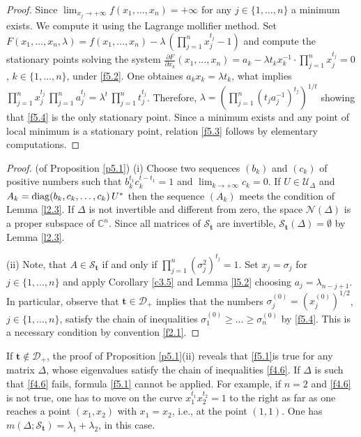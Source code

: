\documentclass{amsart}
\begin{document}
\begin{proof}
Since $\lim_{x_j \to +\infty} f(x_1,\ldots,x_n) = +\infty$ for any $j \in \{ 1,\ldots,n\}$ a minimum exists. We compute it using the Lagrange mollifier method. Set $F(x_1,\ldots,x_n,\lambda) = f(x_1,\ldots,x_n) - \lambda  \, \left(\prod_{j=1}^n x_j^{t_j} - 1\right)$ and compute the stationary points solving the system $\frac{{\partial} F}{{\partial} x_k} (x_1,\ldots,x_n) = a_k - \lambda t_kx_k^{-1} \cdot \prod_{j=1}^n x_j^{t_j} =0$, $k \in \{ 1,\ldots,n \}$, under \eqref{f5.2}. One obtaines $a_kx_k=\lambda t_k$, what implies $\prod_{j=1}^n x_j^{t_j} \, \prod_{j=1}^n a_j^{t_j} = \lambda^t \, \prod_{j=1}^n t_j^{t_j}$. Therefore, $\lambda= \left( \prod_{j=1}^n (t_j a_j^{-1})^{t_j} \right)^{1/t}$ showing that \eqref{f5.4} is the only stationary point. Since a minimum exists and any point of local minimum is a stationary point, relation \eqref{f5.3} follows by elementary computations.
\end{proof}

\begin{proof} (of Proposition \ref{p5.1})
(i) Choose two sequences $(b_k)$ and $(c_k)$ of positive numbers such that $b_k^{t_1} c_k^{t-t_1} = 1$ and $\lim_{k \to +\infty} c_k =0$. If $U \in{\mathcal U}_\Delta$ and $A_k= {\rm diag}(b_k,c_k,\ldots,c_k) \, U^*$ then the sequence $(A_k)$ meets the condition of Lemma \ref{l2.3}. If $\Delta$ is not invertible and different from zero, the space ${\mathcal N}(\Delta)$ is a proper subspace of ${\mathbb C}^n$. Since all matrices of ${\mathcal S}_{\mathbf t}$ are invertible,  ${\mathcal S}_{\mathbf t}(\Delta) = \emptyset$ by Lemma \ref{l2.3}.

(ii) Note, that  $A \in {\mathcal S}_{\mathbf t}$ if and only if $\prod_{j=1}^n (\sigma_j^2)^{t_j}=1$. Set $x_j=\sigma_j$ for $j \in \{ 1,\ldots,n \}$ and apply Corollary \ref{c3.5} and Lemma \ref{l5.2} choosing $a_j=\lambda_{n-j+1}$. In particular, observe that ${\mathbf t} \in {\mathcal D}_+$ implies that the numbers $\sigma_j^{(0)}=(x_j^{(0)})^{1/2}$, $j \in \{ 1,\ldots,n \}$, satisfy the chain of inequalities $\sigma_1^{(0)} \geq \ldots \geq \sigma_n^{(0)}$ by \eqref{f5.4}. This is a necessary condition by convention \eqref{f2.1}.
\end{proof}

\begin{rmk} \label{r5.3}
If ${\mathbf t} \not\in {\mathcal D}_+$, the proof of Proposition \ref{p5.1}(ii) reveals that \eqref{f5.1}is true for any matrix $\Delta$, whose eigenvalues satisfy the chain of inequalities \eqref{f4.6}. If $\Delta$ is such that \eqref{f4.6} fails, formula \eqref{f5.1} cannot be applied. For example, if $n=2$ and \eqref{f4.6} is not true, one has to move on the curve $x_1^{t_1} x_2^{t_2}=1$ to the right as far as one reaches a point $(x_1,x_2)$ with $x_1=x_2$, i.e., at the point $(1,1)$. One has $m(\Delta ; {\mathcal S}_{\mathbf t})= \lambda_1+\lambda_2$, in this case. 
\end{rmk}
\end{document}
